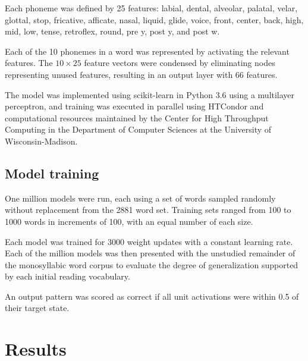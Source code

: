 \documentclass[10pt,letterpaper]{article}
\newcommand{\xy}[2]{$#1\times#2$}
\begin{document}
Each phoneme was defined by 25 features: labial, dental, alveolar, palatal, velar, glottal, stop, fricative, afficate, nasal, liquid, glide, voice, front, center, back, high, mid, low, tense, retroflex, round, pre y, post y, and post w.

Each of the 10 phonemes in a word was represented by activating the relevant features. The \xy{10}{25} feature vectors were condensed by eliminating nodes representing unused features, resulting in an output layer with 66 features.

The model was implemented using scikit-learn in Python 3.6 using a multilayer perceptron, and training was executed in parallel using HTCondor \cite{Thain2005} and computational resources maintained by the Center for High Throughput Computing in the Department of Computer Sciences at the University of Wisconsin-Madison.

\subsection{Model training}
One million models were run, each using a set of words sampled randomly without replacement from the 2881 word set. Training sets ranged from 100 to 1000 words in increments of 100, with an equal number of each size.

Each model was trained for 3000 weight updates with a constant learning rate. Each of the million models was then presented with the unstudied remainder of the monosyllabic word corpus to evaluate the degree of generalization supported by each initial reading vocabulary.

An output pattern was scored as correct if all unit activations were within 0.5 of their target state.

\section{Results}
\end{document}
